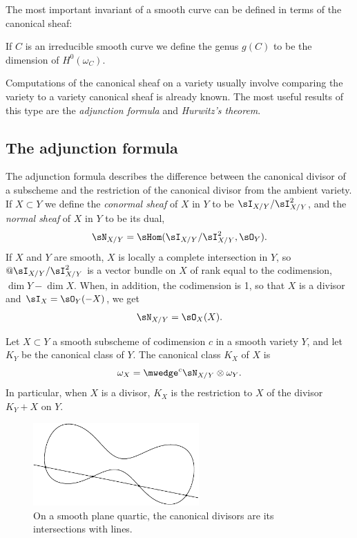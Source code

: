 The most important invariant of a smooth curve can be defined in terms of the canonical sheaf:

\begin{definition}
If $C$ is an irreducible smooth curve we define the genus $g(C)$ to be the dimension of $H^0(\omega_C)$.
\end{definition}

Computations of the canonical sheaf on a variety usually involve
comparing the variety to a variety 
canonical sheaf is already known. The most useful results of this type
are  the \emph{adjunction formula}
and \emph{Hurwitz's theorem}. 

\subsection*{The adjunction formula}%

The adjunction formula describes the difference between the canonical divisor of
a  subscheme and the restriction of the canonical divisor from the ambient variety.
If $X\subset Y$ we define the \emph{conormal sheaf} of $X$ in $Y$ to be $\sI_{X/Y}/\sI_{X/Y}^{2}$,
and the \emph{normal sheaf} of $X$ in $Y$ to be its dual, 
$$
\sN_{X/Y} = \sHom(\sI_{X/Y}/\sI_{X/Y}^{2}, \sO_{Y}).
$$
If $X$ and $Y$ are smooth, $X$ is locally a complete intersection in $Y$, so
 $@\sI_{X/Y}/\sI_{X/Y}^{2}$ 
is a vector bundle on $X$ of rank equal to the codimension, $\dim Y -\dim X$.
 When, in addition, the codimension is 1, so that $X$ is a divisor and $\sI_{X} = \sO_{Y}(-X)$, we get
 $$
 \sN_{X/Y} = \sO_{X}(X).
 $$


\begin{proposition}\label{adjunction}
 Let $X\subset Y$ a smooth subscheme of codimension $c$ in a smooth variety $Y$, and let $K_{Y}$ be the canonical class of $Y$. The canonical class $K_X$ of $X$ is 
%
 $$
 \omega_{X} = \mwedge^{c} \sN_{X/Y} \otimes \omega_{Y}.
 $$
In particular, when $X$ is a divisor, $K_{X}$ is the restriction to $X$ of the divisor $K_{Y}+X$ on $Y$.
\end{proposition}

\begin{figure}
\centerline{\includegraphics[width=2.5in]{"main/Fig02-1"}}
\caption{On a smooth plane quartic, the canonical divisors are its
  intersections with lines.
}
\end{figure}


